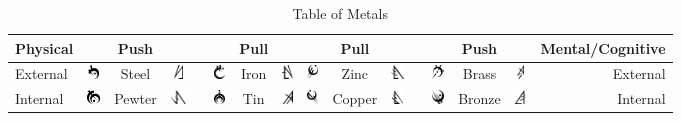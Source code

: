 \documentclass[conference]{IEEEtran}
\begin{document}
\begin{table}[!hb]
	
	\caption{Table of Metals}
	\centering
	\begin{tabular}{ |l |ccc c ccc | ccc c ccc | r| }
		\hline
		Physical&&Push&&&&Pull&&&Pull&&&&Push&&Mental/Cognitive\\\hline
		External&\includegraphics[height=1em]{images/Steel.png}& Steel & \includegraphics[height=1em]{images/Steel_(Feruchemy).png}&&\includegraphics[height=1em]{images/Iron.png}& Iron& \includegraphics[height=1em]{images/Iron_(Feruchemy).png}&\includegraphics[height=1em]{images/Zinc.png} &Zinc& \includegraphics[height=1em]{images/Zinc_(Feruchemy).png}&&\includegraphics[height=1em]{images/Brass.png}& Brass& \includegraphics[height=1em]{images/Brass_(Feruchemy).png}&External\\
		Internal&\includegraphics[height=1em]{images/Pewter.png} &Pewter& \includegraphics[height=1em]{images/Pewter_(Feruchemy).png}&&\includegraphics[height=1em]{images/Tin.png} &Tin& \includegraphics[height=1em]{images/Tin_(Feruchemy).png}&\includegraphics[height=1em]{images/Copper.png} &Copper& \includegraphics[height=1em]{images/Copper_(Feruchemy).png}&&\includegraphics[height=1em]{images/Bronze.png}& Bronze& \includegraphics[height=1em]{images/Bronze_(Feruchemy).png}&Internal\\

\end{tabular}
\end{table}
\end{document}
